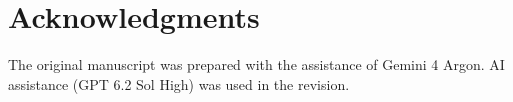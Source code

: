 \documentclass[11pt,a4paper]{article}
\numberwithin{equation}{section}
\theoremstyle{remark}
\begin{document}
\section*{Acknowledgments}

The original manuscript was prepared with the assistance of Gemini 4 Argon. AI assistance (GPT 6.2 Sol High) was used in the revision.

\begingroup
\small
\let\normalbibliography\thebibliography
\renewcommand{\thebibliography}[1]{%
  \normalbibliography{#1}%
  \setlength{\itemsep}{2pt}%
  \setlength{\parsep}{0pt}%
}


\endgroup
\end{document}
